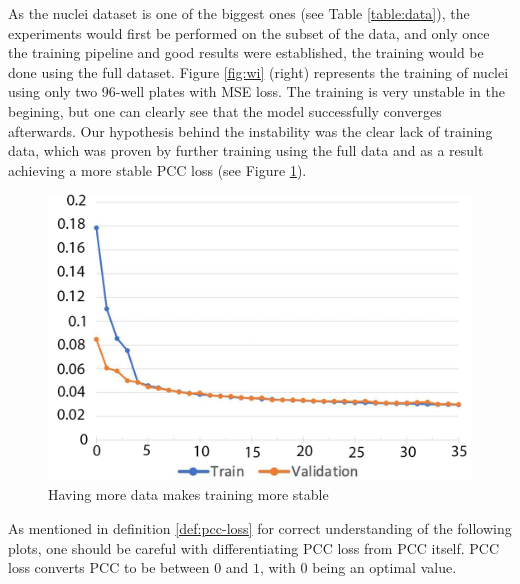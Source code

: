 

As the nuclei dataset is one of the biggest ones (see Table \ref{table:data}), the experiments would first be performed on the subset of the data, and only once the training pipeline and good results were established, the training would be done using the full dataset. Figure \ref{fig:wi} (right) represents the training of nuclei using only two 96-well plates with MSE loss. The training is very unstable in the begining, but one can clearly see that the model successfully converges afterwards. Our hypothesis behind the instability was the clear lack of training data, which was proven by further training using the full data and as a result achieving a more stable PCC loss (see Figure \ref{fig:full-dataset-pcc}).

\begin{figure}[H]
	\begin{center}
		\includegraphics[width=0.5\linewidth]{bilder/nuclei/full-dataset.png}
		\caption{Having more data makes training more stable}\label{fig:full-dataset-pcc}
	\end{center}
\end{figure}

As mentioned in definition \ref{def:pcc-loss} for correct understanding of the following plots, one should be careful with differentiating PCC loss from PCC itself. PCC loss converts PCC to be between $0$ and $1$, with $0$ being an optimal value.

